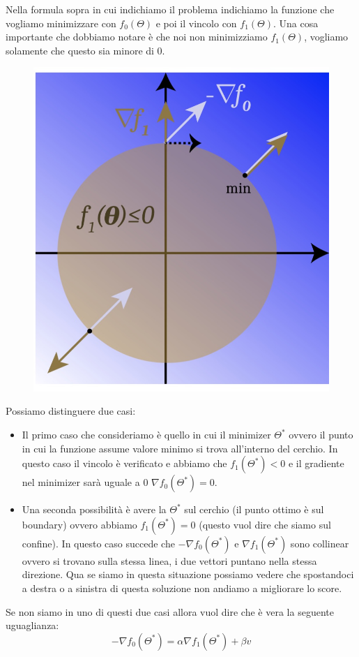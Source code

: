 \documentclass[14pt]{extreport}
\begin{document}
Nella formula sopra in cui indichiamo il problema indichiamo la funzione che vogliamo minimizzare con $f_0(\Theta)$ e poi il vincolo con
$f_1(\Theta)$. Una cosa importante che dobbiamo notare è che noi non minimizziamo $f_1(\Theta)$, vogliamo solamente che questo sia minore di 0.

\begin{figure}[H]
\centering
\includegraphics[width=0.5\linewidth]{290.jpeg}
\end{figure}

Possiamo distinguere due casi:
\begin{itemize}
\item Il primo caso che consideriamo è quello in cui il minimizer $\Theta^*$ ovvero il punto in cui la funzione assume valore minimo si trova
all'interno del cerchio. In questo caso il vincolo è verificato e abbiamo che $f_1(\Theta^*) < 0$ e il gradiente nel minimizer sarà uguale a 0 $\nabla
f_0(\Theta^*) = 0$.
\item Una seconda possibilità è avere la $\Theta^*$ sul cerchio (il punto ottimo è sul boundary) ovvero abbiamo $f_1(\Theta^*) = 0$ (questo vuol dire
che siamo sul confine). In questo caso succede che $-\nabla f_0(\Theta^*)$ e $\nabla f_1(\Theta^*)$ sono collinear ovvero si trovano sulla stessa
linea, i due vettori puntano nella stessa direzione. Qua se siamo in questa situazione possiamo vedere che spostandoci a destra o a sinistra di questa
soluzione non andiamo a migliorare lo score.
\end{itemize}

Se non siamo in uno di questi due casi allora vuol dire che è vera la seguente uguaglianza:
$$-\nabla f_0(\Theta^*) = \alpha \nabla f_1(\Theta^*) + \beta v$$
\end{document}

